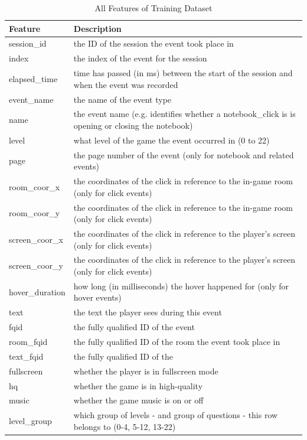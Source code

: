 \documentclass[11pt,a4paper]{article}
\begin{document}
    \begin{table}[H]
        \centering
        \begin{tabular}{l|l}
            \textbf{Feature} & \textbf{Description} \\ \hline
            session\_id & the ID of the session the event took place in \\
            index & the index of the event for the session \\
            elapsed\_time & time has passed (in ms) between the start of the session and when the event was recorded \\
            event\_name & the name of the event type \\
            name & the event name (e.g. identifies whether a notebook\_click is is opening or closing the notebook) \\
            level & what level of the game the event occurred in (0 to 22) \\
            page & the page number of the event (only for notebook and related events) \\
            room\_coor\_x & the coordinates of the click in reference to the in-game room (only for click events) \\
            room\_coor\_y & the coordinates of the click in reference to the in-game room (only for click events) \\
            screen\_coor\_x & the coordinates of the click in reference to the player’s screen (only for click events) \\
            screen\_coor\_y & the coordinates of the click in reference to the player’s screen (only for click events) \\
            hover\_duration & how long (in milliseconds) the hover happened for (only for hover events) \\
            text & the text the player sees during this event \\
            fqid & the fully qualified ID of the event \\
            room\_fqid & the fully qualified ID of the room the event took place in \\
            text\_fqid & the fully qualified ID of the \\
            fullscreen & whether the player is in fullscreen mode \\
            hq & whether the game is in high-quality \\
            music & whether the game music is on or off \\
            level\_group & which group of levels - and group of questions - this row belongs to (0-4, 5-12, 13-22) \\
        \end{tabular}
        \caption{All Features of Training Dataset}
        \label{tab:training_features}
    \end{table}
    
\end{document}

